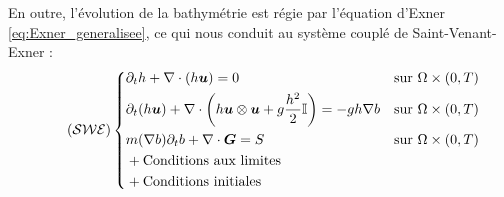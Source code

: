 \documentclass[11pt, a4paper, oneside]{report}
\begin{document}
En outre, l'évolution de la bathymétrie est régie par l'équation d'Exner \eqref{eq:Exner_generalisee}, ce qui nous conduit au système couplé de Saint-Venant-Exner :
\begin{equation} \tag{$\mathcal{SWE}$} \label{eq:Saint_Venant_Exner}
    \left \{
    \begin{aligned}
        & \partial_t h + \nabla \cdot \left( h \bm{u} \right) = 0 && \text{sur } \Omega \times (0, T) \\
        & \partial_t (h \bm{u}) + \nabla \cdot \left( h \bm{u} \otimes \bm{u} + g \frac{h^2}{2} \mathbb{I} \right) = - g h \nabla b && \text{sur } \Omega \times (0, T) \\
        & m(\nabla b) \partial_t b + \nabla \cdot \bm{G} = S && \text{sur } \Omega \times (0, T) \\
        & + \text{Conditions aux limites} \\
        & + \text{Conditions initiales}
    \end{aligned}
    \right .
\end{equation}
\end{document}
